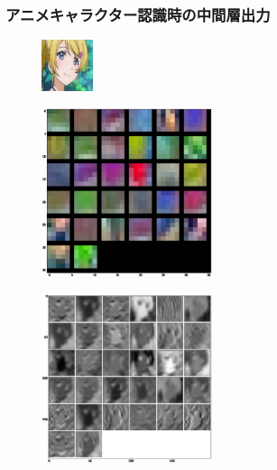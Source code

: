\documentclass[dvipdfmx,11pt,notheorems]{beamer}
\theoremstyle{definition}
\begin{document}
\begin{frame}\frametitle{アニメキャラクター認識時の中間層出力}
\begin{figure}[t]
  \centering
  \includegraphics[clip,width=1.5cm]{./fig/eps/eri.eps}
\end{figure}
\begin{figure}[t]
 \begin{minipage}{0.45\hsize}
  \centering
  \includegraphics[width=50mm]{./fig/eps/filtereri.eps} \\
 \end{minipage}
 \begin{minipage}{0.45\hsize}
  \centering
  \includegraphics[width=50mm]{./fig/eps/outputeri.eps}\\
 \end{minipage}
\end{figure}
\end{frame}
\end{document}
